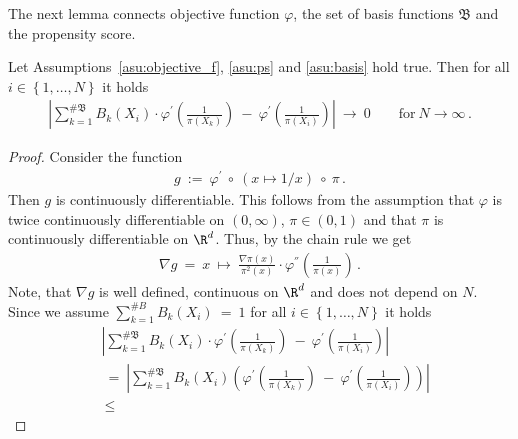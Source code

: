 The next lemma connects objective function $\varphi$, the set of basis functions $\mathfrak{B}$ and the propensity score.

\begin{lemma}
  Let Assumptions~\ref{asu:objective_f}, \ref{asu:ps} and \ref{asu:basis} hold true.
  Then for all
  $i\in \left\{ 1,\ldots,N \right\}$ it holds
  \begin{gather*}
   \left| 
   \sum_{k=1}^{\# \mathfrak{B}} 
   B_k(X_i)
   \cdot
   \varphi^{'}
   \left( 
     \frac{1}{\pi(X_k)}
   \right)
   \ 
   -
   \ 
   \varphi^{'}
   \left( 
     \frac{1}{\pi(X_i)}
   \right)
   \right| 
   \ 
   \to
   \ 
   0
   \qquad
   \text{for}
   \ 
   N\to\infty
   \,.
  \end{gather*}
\end{lemma}

\begin{proof}
  Consider the function 
  \begin{gather*}
  g
  \ 
  :=
  \ 
  \varphi^{'}
  \ 
  \circ 
  \ 
  (x\mapsto 1/x) 
  \ 
  \circ
  \ 
  \pi
  \,.
  \end{gather*}
  Then $g$ is continuously differentiable.
  This follows from the assumption that
  $\varphi$ is twice continuously differentiable on $(0,\infty)$, $\pi\in (0,1)$ and that $\pi$ is continuously differentiable on 
  $\R^d$.
  Thus, by the chain rule we get
  \begin{gather*}
   \nabla
   g
   \ 
   =
   \ 
   x
   \ 
   \mapsto
   \ 
   \frac{\nabla \pi(x)}{\pi^2(x)}
   \cdot
   \varphi^{''}\left( \frac{1}{\pi(x)} \right)
   \,.
  \end{gather*}
  Note, that $\nabla g$ is well defined, continuous on $\R^d$
  and does not depend on $N$.
  Since we assume
      $
      \sum_{k=1}^{\# B} 
      B_k(X_i)
      \ 
      =
      \ 
      1
      $
      for all 
      $i\in \left\{ 1,\ldots ,N \right\}$
      it holds
      \begin{align*}
   &
   \left| 
   \sum_{k=1}^{\# \mathfrak{B}} 
   B_k(X_i)
   \cdot
   \varphi^{'}
   \left( 
     \frac{1}{\pi(X_k)}
   \right)
   \ 
   -
   \ 
   \varphi^{'}
   \left( 
     \frac{1}{\pi(X_i)}
   \right)
   \right| 
   \\
   &
   \ 
   =
   \ 
   \left| 
   \sum_{k=1}^{\# \mathfrak{B}} 
   B_k(X_i)
   \left( 
   \varphi^{'}
   \left( 
     \frac{1}{\pi(X_k)}
   \right)
   \ 
   -
   \ 
   \varphi^{'}
   \left( 
     \frac{1}{\pi(X_i)}
   \right)
   \right)
   \right| 
\\
   &
   \ 
   \le
   \ 

\end{align*}
\end{proof}

